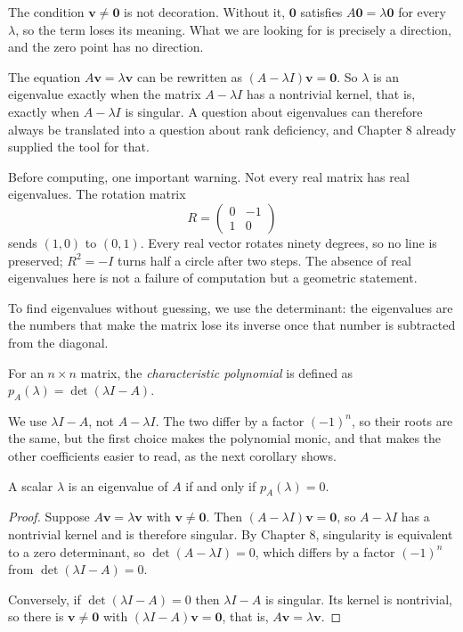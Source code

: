 The condition $\mathbf{v}\neq\mathbf{0}$ is not decoration. Without it, $\mathbf{0}$ satisfies
$A\mathbf{0}=\lambda\mathbf{0}$ for every $\lambda$, so the term loses its meaning. What we are
looking for is precisely a direction, and the zero point has no direction.

The equation $A\mathbf{v}=\lambda\mathbf{v}$ can be rewritten as
$(A-\lambda I)\mathbf{v}=\mathbf{0}$. So $\lambda$ is an eigenvalue exactly when the matrix
$A-\lambda I$ has a nontrivial kernel, that is, exactly when $A-\lambda I$ is singular. A question
about eigenvalues can therefore always be translated into a question about rank deficiency, and
Chapter 8 already supplied the tool for that.

Before computing, one important warning. Not every real matrix has real eigenvalues. The rotation
matrix
\[
  R=\begin{pmatrix}0&-1\\ 1&0\end{pmatrix}
\]
sends $(1,0)$ to $(0,1)$. Every real vector rotates ninety degrees, so no line is preserved;
$R^{2}=-I$ turns half a circle after two steps. The absence of real eigenvalues here is not a
failure of computation but a geometric statement.

To find eigenvalues without guessing, we use the determinant: the eigenvalues are the numbers that
make the matrix lose its inverse once that number is subtracted from the diagonal.


\begin{definisi}
For an $n\times n$ matrix, the \emph{characteristic polynomial} is defined as
$p_{A}(\lambda)=\det(\lambda I-A)$.
\end{definisi}

We use $\lambda I-A$, not $A-\lambda I$. The two differ by a factor $(-1)^{n}$, so their roots are
the same, but the first choice makes the polynomial monic, and that makes the other coefficients
easier to read, as the next corollary shows.

\begin{teorema}
A scalar $\lambda$ is an eigenvalue of $A$ if and only if $p_{A}(\lambda)=0$.
\end{teorema}

\begin{proof}
Suppose $A\mathbf{v}=\lambda\mathbf{v}$ with $\mathbf{v}\neq\mathbf{0}$. Then
$(A-\lambda I)\mathbf{v}=\mathbf{0}$, so $A-\lambda I$ has a nontrivial kernel and is therefore
singular. By Chapter 8, singularity is equivalent to a zero determinant, so
$\det(A-\lambda I)=0$, which differs by a factor $(-1)^{n}$ from $\det(\lambda I-A)=0$.

Conversely, if $\det(\lambda I-A)=0$ then $\lambda I-A$ is singular. Its kernel is nontrivial, so
there is $\mathbf{v}\neq\mathbf{0}$ with $(\lambda I-A)\mathbf{v}=\mathbf{0}$, that is,
$A\mathbf{v}=\lambda\mathbf{v}$.
\end{proof}

